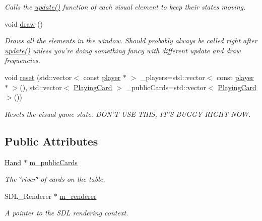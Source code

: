 \begin{DoxyCompactItemize}
\begin{DoxyCompactList}\small\item\em Calls the \hyperlink{classGUI_1_1DealerGUI_a479eecd663924d0616e516af9ca2679e}{update()} function of each visual element to keep their states moving. \end{DoxyCompactList}\item 
void \hyperlink{classGUI_1_1DealerGUI_a034f53fffe418f01eadd8e7aa7a74589}{draw} ()
\begin{DoxyCompactList}\small\item\em Draws all the elements in the window. Should probably always be called right after \hyperlink{classGUI_1_1DealerGUI_a479eecd663924d0616e516af9ca2679e}{update()} unless you're doing something fancy with different update and draw frequencies. \end{DoxyCompactList}\item 
void \hyperlink{classGUI_1_1DealerGUI_aa4cca14de7ab4526b6fafc6c5f226397}{reset} (std\-::vector$<$ const \hyperlink{classplayer}{player} $\ast$ $>$ \-\_\-players=std\-::vector$<$ const \hyperlink{classplayer}{player} $\ast$ $>$(), std\-::vector$<$ \hyperlink{classPlayingCard}{Playing\-Card} $>$ \-\_\-public\-Cards=std\-::vector$<$ \hyperlink{classPlayingCard}{Playing\-Card} $>$())
\begin{DoxyCompactList}\small\item\em Resets the visual game state. D\-O\-N'T U\-S\-E T\-H\-I\-S, I\-T'S B\-U\-G\-G\-Y R\-I\-G\-H\-T N\-O\-W. \end{DoxyCompactList}\end{DoxyCompactItemize}
\subsection*{Public Attributes}
\begin{DoxyCompactItemize}
\item 
\hyperlink{classGUI_1_1Hand}{Hand} $\ast$ \hyperlink{classGUI_1_1DealerGUI_a3f31e18b4139bd25499b4b947bfdfa00}{m\-\_\-public\-Cards}
\begin{DoxyCompactList}\small\item\em The \char`\"{}river\char`\"{} of cards on the table. \end{DoxyCompactList}\item 
S\-D\-L\-\_\-\-Renderer $\ast$ \hyperlink{classGUI_1_1DealerGUI_a9e8046ba588810bc65e6df86c20225fc}{m\-\_\-renderer}
\begin{DoxyCompactList}\small\item\em A pointer to the S\-D\-L rendering context. \end{DoxyCompactList}\end{DoxyCompactItemize}
